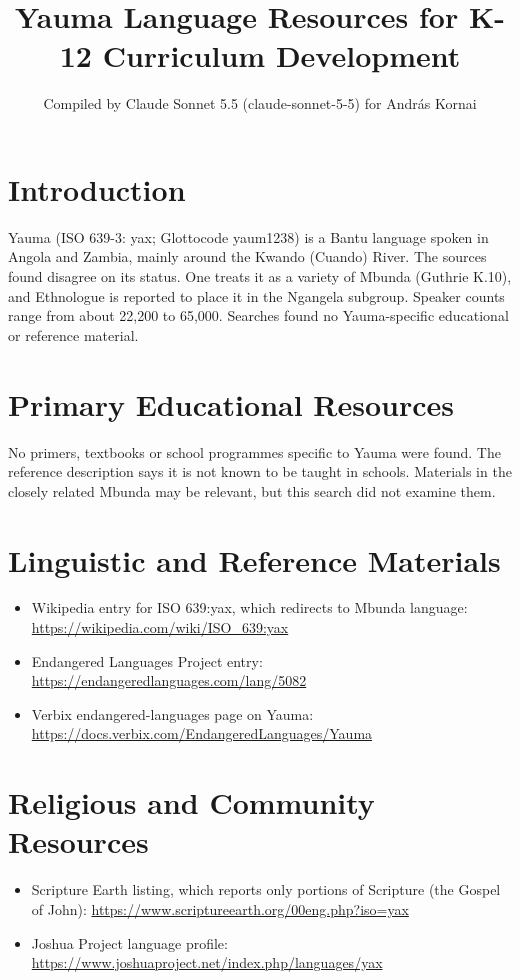 \documentclass[12pt]{article}
\title{Yauma Language Resources for K-12 Curriculum Development}
\author{Compiled by Claude Sonnet 5.5 (claude-sonnet-5-5) for Andr\'as Kornai}
\date{}
\begin{document}
\maketitle

\section{Introduction}
Yauma (ISO 639-3: yax; Glottocode yaum1238) is a Bantu language spoken in Angola and Zambia, mainly around the Kwando (Cuando) River. The sources found disagree on its status. One treats it as a variety of Mbunda (Guthrie K.10), and Ethnologue is reported to place it in the Ngangela subgroup. Speaker counts range from about 22,200 to 65,000. Searches found no Yauma-specific educational or reference material.

\section{Primary Educational Resources}
No primers, textbooks or school programmes specific to Yauma were found. The reference description says it is not known to be taught in schools. Materials in the closely related Mbunda may be relevant, but this search did not examine them.

\section{Linguistic and Reference Materials}
\begin{itemize}
\item Wikipedia entry for ISO 639:yax, which redirects to Mbunda language: \url{https://wikipedia.com/wiki/ISO_639:yax}
\item Endangered Languages Project entry: \url{https://endangeredlanguages.com/lang/5082}
\item Verbix endangered-languages page on Yauma: \url{https://docs.verbix.com/EndangeredLanguages/Yauma}
\end{itemize}

\section{Religious and Community Resources}
\begin{itemize}
\item Scripture Earth listing, which reports only portions of Scripture (the Gospel of John): \url{https://www.scriptureearth.org/00eng.php?iso=yax}
\item Joshua Project language profile: \url{https://www.joshuaproject.net/index.php/languages/yax}
\end{itemize}
\end{document}
